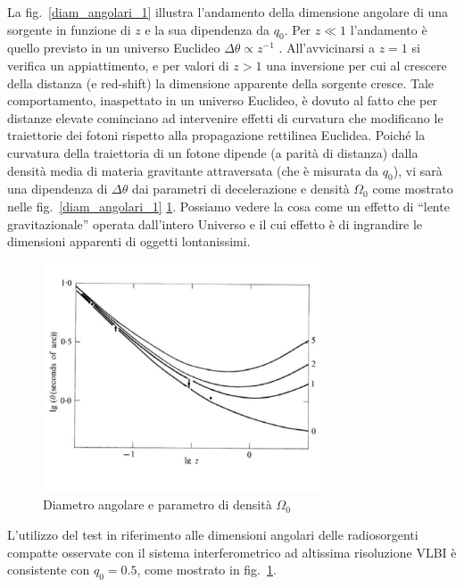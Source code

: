 La fig.~\ref{diam_angolari_1} illustra l'andamento della dimensione angolare di
una sorgente in funzione di $z$ e la sua dipendenza da $q_0$. Per $z\ll 1$
l'andamento è quello previsto in un universo Euclideo $\Delta \theta \propto
z^{-1}$ .  All'avvicinarsi a $z=1$ si verifica un appiattimento, e per valori di
$z>1$ una inversione per cui al crescere della distanza (e red-shift) la
dimensione apparente della sorgente cresce.  Tale comportamento, inaspettato in
un universo Euclideo, è dovuto al fatto che per distanze elevate cominciano ad
intervenire effetti di curvatura che modificano le traiettorie dei fotoni
rispetto alla propagazione rettilinea Euclidea.  Poiché la curvatura della
traiettoria di un fotone dipende (a parità di distanza) dalla densità media di
materia gravitante attraversata (che è misurata da $q_0$), vi sarà una
dipendenza di $\Delta \theta$ dai parametri di decelerazione e densità
$\Omega_0$ come mostrato nelle fig.~\ref{diam_angolari_1} \ref{diam_angolari_2}.
Possiamo vedere la cosa come un effetto di ``lente gravitazionale'' operata
dall'intero Universo e il cui effetto è di ingrandire le dimensioni apparenti di
oggetti lontanissimi.
\begin{figure}
  \centering{}
  \includegraphics[width=0.75\textwidth]{figure/diametri_angolari_2.pdf}
  \caption{Diametro angolare e parametro di densità $\Omega_0$}
  \label{diam_angolari_2}
\end{figure}
L'utilizzo del test in riferimento alle dimensioni angolari delle radiosorgenti
compatte osservate con il sistema interferometrico ad altissima risoluzione VLBI
è consistente con $q_0=0.5$, come mostrato in fig.~\ref{diam_angolari_2}.

